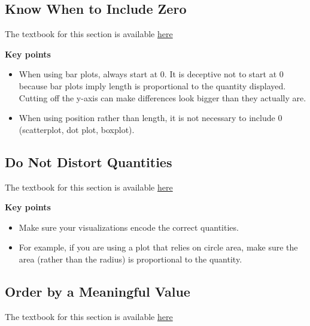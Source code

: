 \documentclass[
]{article}
\providecommand{\tightlist}{%
  \setlength{\itemsep}{0pt}\setlength{\parskip}{0pt}}
\begin{document}
\hypertarget{know-when-to-include-zero}{%
\subsection{Know When to Include Zero}\label{know-when-to-include-zero}}

The textbook for this section is available
\href{https://rafalab.github.io/dsbook/data-visualization-principles.html\#know-when-to-include-0}{here}

\textbf{Key points}

\begin{itemize}
\tightlist
\item
  When using bar plots, always start at 0. It is deceptive not to start
  at 0 because bar plots imply length is proportional to the quantity
  displayed. Cutting off the y-axis can make differences look bigger
  than they actually are.
\item
  When using position rather than length, it is not necessary to include
  0 (scatterplot, dot plot, boxplot).
\end{itemize}

\hypertarget{do-not-distort-quantities}{%
\subsection{Do Not Distort Quantities}\label{do-not-distort-quantities}}

The textbook for this section is available
\href{https://rafalab.github.io/dsbook/data-visualization-principles.html\#do-not-distort-quantities}{here}

\textbf{Key points}

\begin{itemize}
\tightlist
\item
  Make sure your visualizations encode the correct quantities.
\item
  For example, if you are using a plot that relies on circle area, make
  sure the area (rather than the radius) is proportional to the
  quantity.
\end{itemize}

\hypertarget{order-by-a-meaningful-value}{%
\subsection{Order by a Meaningful
Value}\label{order-by-a-meaningful-value}}

The textbook for this section is available
\href{https://rafalab.github.io/dsbook/data-visualization-principles.html\#order-categories-by-a-meaningful-value}{here}
\end{document}
